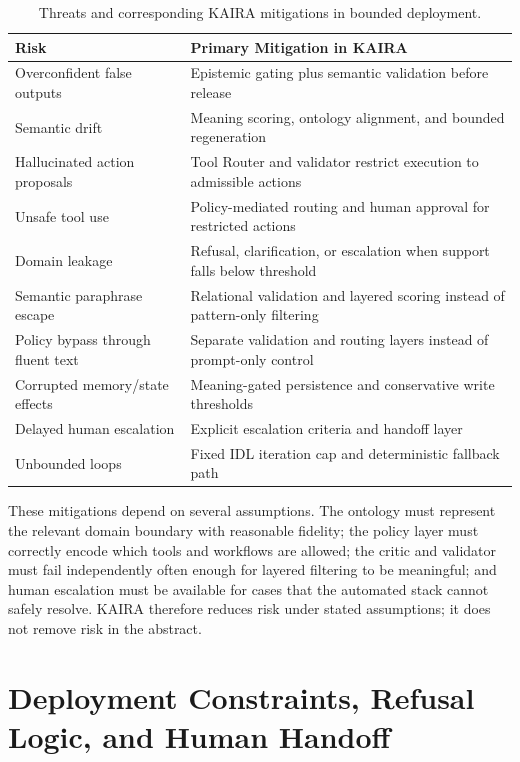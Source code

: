 \documentclass[11pt,a4paper]{article}
\begin{document}
\begin{table}[h]
\centering
\caption{Threats and corresponding KAIRA mitigations in bounded deployment.}
\label{tab:risk}
\begin{tabular}{p{4.6cm} p{7.6cm}}
\toprule
\textbf{Risk} & \textbf{Primary Mitigation in KAIRA} \\
\midrule
Overconfident false outputs & Epistemic gating plus semantic validation before release \\
Semantic drift & Meaning scoring, ontology alignment, and bounded regeneration \\
Hallucinated action proposals & Tool Router and validator restrict execution to admissible actions \\
Unsafe tool use & Policy-mediated routing and human approval for restricted actions \\
Domain leakage & Refusal, clarification, or escalation when support falls below threshold \\
Semantic paraphrase escape & Relational validation and layered scoring instead of pattern-only filtering \\
Policy bypass through fluent text & Separate validation and routing layers instead of prompt-only control \\
Corrupted memory/state effects & Meaning-gated persistence and conservative write thresholds \\
Delayed human escalation & Explicit escalation criteria and handoff layer \\
Unbounded loops & Fixed IDL iteration cap and deterministic fallback path \\
\bottomrule
\end{tabular}
\end{table}

These mitigations depend on several assumptions. The ontology must represent the relevant domain boundary with reasonable fidelity; the policy layer must correctly encode which tools and workflows are allowed; the critic and validator must fail independently often enough for layered filtering to be meaningful; and human escalation must be available for cases that the automated stack cannot safely resolve. KAIRA therefore reduces risk under stated assumptions; it does not remove risk in the abstract.

\section{Deployment Constraints, Refusal Logic, and Human Handoff}
\end{document}
